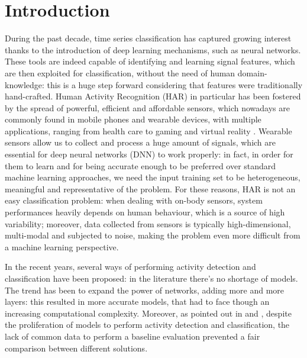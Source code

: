 
\section{Introduction}
\label{sec:introduction}

During the past decade, time series classification has captured growing interest thanks to the introduction of deep learning mechanisms, such as neural networks. These tools are indeed capable of identifying and learning signal features, which are then exploited for classification, without the need of human domain-knowledge: this is a huge step forward considering that features were traditionally hand-crafted.
Human Activity Recognition (HAR) in particular has been fostered by the spread of powerful, efficient and affordable sensors, which nowadays are commonly found in mobile phones and wearable devices, with multiple applications, ranging from health care to gaming and virtual reality \cite{HAR-2013}.
Wearable sensors allow us to collect and process a huge amount of signals, which are essential for deep neural networks (DNN) to work properly: in fact, in order for them to learn and for being accurate enough to be preferred over standard machine learning approaches, we need the input training set to be heterogeneous, meaningful and representative of the problem.
For these reasons, HAR is not an easy classification problem: when dealing with on-body sensors, system performances heavily depends on human behaviour, which is a source of high variability; moreover, data collected from sensors is typically high-dimensional, multi-modal and subjected to noise, making the problem even more difficult from a machine learning perspective. 

In the recent years, several ways of performing activity detection and classification have been proposed: in the literature there's no shortage of models.
The trend has been to expand the power of networks, adding more and more layers: this resulted in more accurate models, that had to face though an increasing computational complexity.  Moreover, as pointed out in \cite{Chavarriaga2013} and \cite{HAR-COMP2018}, despite the proliferation of models to perform activity detection and classification, the lack of common data to perform a baseline evaluation  prevented a fair comparison between different solutions.

